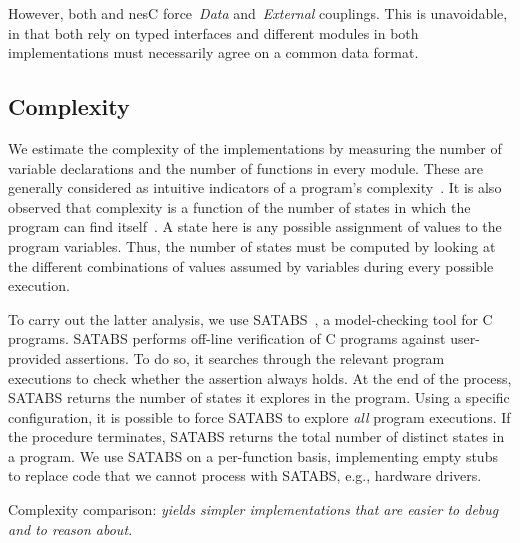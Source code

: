 However, both \conesc and nesC force~\emph{Data} and~\emph{External}
couplings. This is unavoidable, in that both rely on typed interfaces
and different modules in both implementations must necessarily agree
on a common data format.


\subsection{Complexity}\label{sec:complexity}

We estimate the complexity of the implementations by measuring the
number of variable declarations and the number of functions in every
module. These are generally considered as intuitive indicators of a
program's complexity~\cite{koopman10:better}. It is also observed that
complexity is a function of the number of states in which the program
can find itself~\cite{koopman10:better}. A state here is any possible
assignment of values to the program variables. Thus, the number of
states must be computed by looking at the different combinations of
values assumed by variables during every possible execution.

To carry out the latter analysis, we use
SATABS~\cite{clarke05:satabs}, a model-checking tool for C
programs. SATABS performs off-line verification of C programs against
user-provided assertions. To do so, it searches through the relevant
program executions to check whether the assertion always holds. At the
end of the process, SATABS returns the number of states it explores in
the program.  Using a specific configuration, it is possible to force
SATABS to explore \emph{all} program executions. If the procedure
terminates, SATABS returns the total number of distinct states in a
program. We use SATABS on a per-function basis, implementing empty
stubs to replace code that we cannot process with SATABS, e.g.,
hardware drivers.

\begin{table}[!tb]
\renewcommand{\arraystretch}{1.3}
\caption{Complexity comparison: \emph{\conesc yields simpler implementations that are easier to debug and to reason about.}}
\vspace{-2mm}
\label{tab:compres}

\vspace{-2mm}
\end{table}

